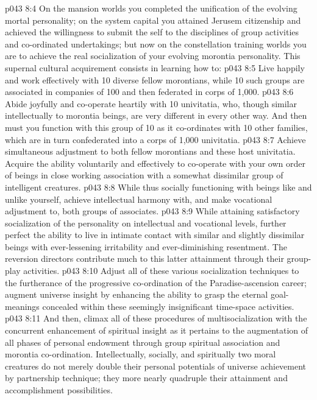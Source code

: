 \vs p043 8:4 On the mansion worlds you completed the unification of the evolving mortal personality; on the system capital you attained Jerusem citizenship and achieved the willingness to submit the self to the disciplines of group activities and co\hyp{}ordinated undertakings; but now on the constellation training worlds you are to achieve the real socialization of your evolving morontia personality. This supernal cultural acquirement consists in learning how to:
\vs p043 8:5 \bibnobreakspace Live happily and work effectively with 10 diverse fellow morontians, while 10 such groups are associated in companies of 100 and then federated in corps of 1,000.
\vs p043 8:6 \bibnobreakspace Abide joyfully and co\hyp{}operate heartily with 10 univitatia, who, though similar intellectually to morontia beings, are very different in every other way. And then must you function with this group of 10 as it co\hyp{}ordinates with 10 other families, which are in turn confederated into a corps of 1,000 univitatia.
\vs p043 8:7 \bibnobreakspace Achieve simultaneous adjustment to both fellow morontians and these host univitatia. Acquire the ability voluntarily and effectively to co\hyp{}operate with your own order of beings in close working association with a somewhat dissimilar group of intelligent creatures.
\vs p043 8:8 \bibnobreakspace While thus socially functioning with beings like and unlike yourself, achieve intellectual harmony with, and make vocational adjustment to, both groups of associates.
\vs p043 8:9 \bibnobreakspace While attaining satisfactory socialization of the personality on intellectual and vocational levels, further perfect the ability to live in intimate contact with similar and slightly dissimilar beings with ever\hyp{}lessening irritability and ever\hyp{}diminishing resentment. The reversion directors contribute much to this latter attainment through their group\hyp{}play activities.
\vs p043 8:10 \bibnobreakspace Adjust all of these various socialization techniques to the furtherance of the progressive co\hyp{}ordination of the Paradise\hyp{}ascension career; augment universe insight by enhancing the ability to grasp the eternal goal\hyp{}meanings concealed within these seemingly insignificant time\hyp{}space activities.
\vs p043 8:11 \bibnobreakspace And then, climax all of these procedures of multisocialization with the concurrent enhancement of spiritual insight as it pertains to the augmentation of all phases of personal endowment through group spiritual association and morontia co\hyp{}ordination. Intellectually, socially, and spiritually two moral creatures do not merely double their personal potentials of universe achievement by partnership technique; they more nearly quadruple their attainment and accomplishment possibilities.
